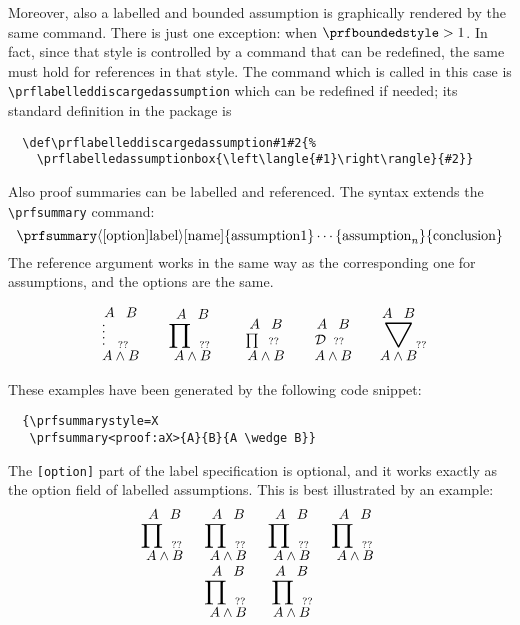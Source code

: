 \documentclass{amsart}
\begin{document}
Moreover, also a labelled and bounded assumption is graphically
rendered by the same command. There is just one exception: when
$\verb|\prfboundedstyle| > 1$. In fact, since that style is
controlled by a command that can be redefined, the same must hold for
references in that style. The command which is called in this case is
\verb|\prflabelleddiscargedassumption| which can be redefined if
needed; its standard definition in the package is
\begin{verbatim}
  \def\prflabelleddiscargedassumption#1#2{%
    \prflabelledassumptionbox{\left\langle{#1}\right\rangle}{#2}}
\end{verbatim}\vspace{2ex}

Also proof summaries can be labelled and referenced. The syntax
extends the \verb|\prfsummary| command:
\begin{displaymath}
  \verb|\prfsummary|\langle[\mathrm{option}]\mathrm{label}\rangle
  [\mathrm{name}]\{\mathrm{assumption}1\} \cdots
  \{\mathrm{assumption}_n\}\{\mathrm{conclusion}\} 
\end{displaymath}
The reference argument works in the same way as the corresponding one
for assumptions, and the options are the same.

\begin{displaymath}
  \setcounter{prfsummarycounter}{0}
  \begin{array}{c@{\qquad}c@{\qquad}c@{\qquad}c@{\qquad}c}
    {\prfsummarystyle=0
      \prfsummary<proof:a0>{A}{B}{A \wedge B}} &
    {\prfsummarystyle=1
      \prfsummary<proof:a1>{A}{B}{A \wedge B}} &
    {\prfsummarystyle=2
      \prfsummary<proof:a2>{A}{B}{A \wedge B}} &
    {\prfsummarystyle=3
      \prfsummary<proof:a3>{A}{B}{A \wedge B}} &
    {\prfsummarystyle=4
      \prfsummary<proof:a4>{A}{B}{A \wedge B}} 
  \end{array}
\end{displaymath}

These examples have been generated by the following code snippet:
\begin{verbatim}
  {\prfsummarystyle=X
   \prfsummary<proof:aX>{A}{B}{A \wedge B}}
\end{verbatim}

The \verb|[option]| part of the label specification is optional, and
it works exactly as the option field of labelled assumptions. This is
best illustrated by an example:
\begin{displaymath}
  \setcounter{prfsummarycounter}{0}
  \begin{array}{cccc}
    {\prfsummarystyle=1
    \prfsummary<[r]proof:b1>{A}{B}{A \wedge B}} &
    {\prfsummarystyle=1
    \prfsummary<[R]proof:b2>{A}{B}{A \wedge B}} &
    {\prfsummarystyle=1
    \prfsummary<[f]proof:b3>{A}{B}{A \wedge B}} &
    {\prfsummarystyle=1
    \prfsummary<[a]proof:b4>{A}{B}{A \wedge B}} \\ &
    {\prfsummarystyle=1
    \prfsummary<[A]proof:b5>{A}{B}{A \wedge B}} &
    {\prfsummarystyle=1
    \prfsummary<[l]proof:b3>{A}{B}{A \wedge B}} &
  \end{array}
\end{displaymath}
\end{document}
